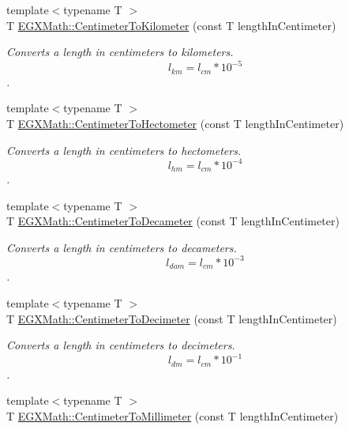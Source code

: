 \begin{DoxyCompactItemize}
{\footnotesize template$<$typename T $>$ }\\T \mbox{\hyperlink{group___e_g_x_math-_conversions-_length_conversions-_centimeter-_s_i_ga3735c75e13286501568075ee1dfb97b7}{E\+G\+X\+Math\+::\+Centimeter\+To\+Kilometer}} (const T length\+In\+Centimeter)
\begin{DoxyCompactList}\small\item\em Converts a length in centimeters to kilometers. \[ l_{km}=l_{cm} * 10^{-5} \]. \end{DoxyCompactList}\item 
{\footnotesize template$<$typename T $>$ }\\T \mbox{\hyperlink{group___e_g_x_math-_conversions-_length_conversions-_centimeter-_s_i_ga311c96c2d32cb295453bff9cbdfd8cdc}{E\+G\+X\+Math\+::\+Centimeter\+To\+Hectometer}} (const T length\+In\+Centimeter)
\begin{DoxyCompactList}\small\item\em Converts a length in centimeters to hectometers. \[ l_{hm}=l_{cm} * 10^{-4} \]. \end{DoxyCompactList}\item 
{\footnotesize template$<$typename T $>$ }\\T \mbox{\hyperlink{group___e_g_x_math-_conversions-_length_conversions-_centimeter-_s_i_ga5f40a749a8759a89e5c618df3c3b7945}{E\+G\+X\+Math\+::\+Centimeter\+To\+Decameter}} (const T length\+In\+Centimeter)
\begin{DoxyCompactList}\small\item\em Converts a length in centimeters to decameters. \[ l_{dam}=l_{cm} * 10^{-3} \]. \end{DoxyCompactList}\item 
{\footnotesize template$<$typename T $>$ }\\T \mbox{\hyperlink{group___e_g_x_math-_conversions-_length_conversions-_centimeter-_s_i_gae1263088b67f23124cc7770d66fbb38b}{E\+G\+X\+Math\+::\+Centimeter\+To\+Decimeter}} (const T length\+In\+Centimeter)
\begin{DoxyCompactList}\small\item\em Converts a length in centimeters to decimeters. \[ l_{dm}=l_{cm} * 10^{-1} \]. \end{DoxyCompactList}\item 
{\footnotesize template$<$typename T $>$ }\\T \mbox{\hyperlink{group___e_g_x_math-_conversions-_length_conversions-_centimeter-_s_i_ga3adaa50da05ec6ead83e93dbd9406ae0}{E\+G\+X\+Math\+::\+Centimeter\+To\+Millimeter}} (const T length\+In\+Centimeter)

\end{DoxyCompactItemize}
